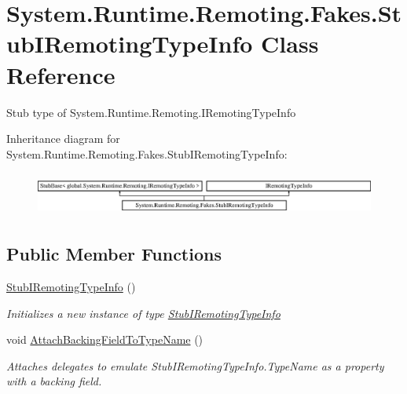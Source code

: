 \hypertarget{class_system_1_1_runtime_1_1_remoting_1_1_fakes_1_1_stub_i_remoting_type_info}{\section{System.\-Runtime.\-Remoting.\-Fakes.\-Stub\-I\-Remoting\-Type\-Info Class Reference}
\label{class_system_1_1_runtime_1_1_remoting_1_1_fakes_1_1_stub_i_remoting_type_info}
}


Stub type of System.\-Runtime.\-Remoting.\-I\-Remoting\-Type\-Info 


Inheritance diagram for System.\-Runtime.\-Remoting.\-Fakes.\-Stub\-I\-Remoting\-Type\-Info\-:\begin{figure}[H]
\begin{center}
\leavevmode
\includegraphics[height=1.454545cm]{class_system_1_1_runtime_1_1_remoting_1_1_fakes_1_1_stub_i_remoting_type_info}
\end{center}
\end{figure}
\subsection*{Public Member Functions}
\begin{DoxyCompactItemize}
\item 
\hyperlink{class_system_1_1_runtime_1_1_remoting_1_1_fakes_1_1_stub_i_remoting_type_info_af7e3307b96d030210f446d4f0f2698c7}{Stub\-I\-Remoting\-Type\-Info} ()
\begin{DoxyCompactList}\small\item\em Initializes a new instance of type \hyperlink{class_system_1_1_runtime_1_1_remoting_1_1_fakes_1_1_stub_i_remoting_type_info}{Stub\-I\-Remoting\-Type\-Info}\end{DoxyCompactList}\item 
void \hyperlink{class_system_1_1_runtime_1_1_remoting_1_1_fakes_1_1_stub_i_remoting_type_info_a4dcaa969433e039c48cdb0dfab331d6b}{Attach\-Backing\-Field\-To\-Type\-Name} ()
\begin{DoxyCompactList}\small\item\em Attaches delegates to emulate Stub\-I\-Remoting\-Type\-Info.\-Type\-Name as a property with a backing field.\end{DoxyCompactList}\end{DoxyCompactItemize}
